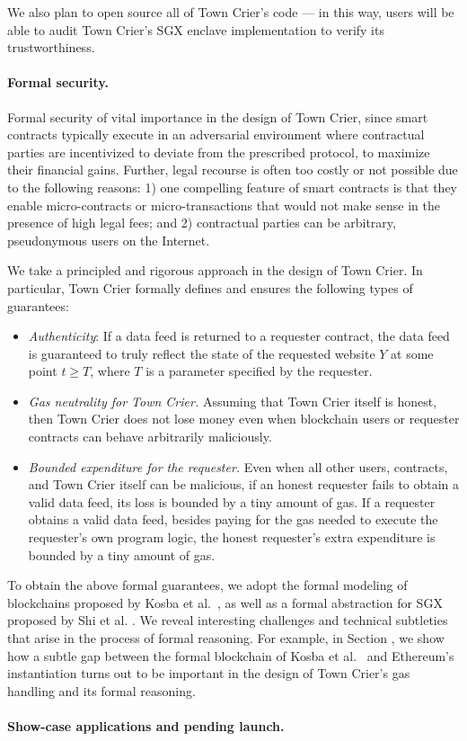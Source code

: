 We also plan to open source all of Town Crier's code --- in this way, 
users will be able to audit Town Crier's SGX enclave implementation
to verify its trustworthiness.


\paragraph{Formal security.}
Formal security of vital importance in the design of Town Crier, since
smart contracts  typically execute in an adversarial environment
where contractual parties are incentivized to 
deviate from the prescribed protocol, to maximize their financial gains.
Further, 
legal recourse is often too costly or 
not possible due to the following reasons:
1) one compelling feature of 
smart contracts is that they enable 
micro-contracts or micro-transactions that 
would not make sense in the presence of high legal fees;
and 2) contractual parties can be arbitrary, pseudonymous users on the Internet.

We take a principled and rigorous approach in the design of Town Crier. 
In particular, Town Crier formally defines and ensures  
the following types of guarantees:

\begin{itemize}[leftmargin=5mm]
\item
{\it Authenticity}: If a data feed is returned
to a requester contract, the data feed is guaranteed
to truly reflect the state of 
the requested website $Y$ 
at some point $t \geq T$, where $T$ is a parameter  specified 
by the requester.
\item
{\it Gas neutrality for Town Crier.} 
Assuming that Town Crier itself is honest, 
then Town Crier does not lose money   
even when blockchain users or requester contracts
can behave arbitrarily maliciously.
\item
{\it Bounded expenditure for the requester.} 
Even when all other users, contracts, and Town Crier itself 
can be malicious, 
if an honest requester  
fails to obtain a valid data feed, its loss is bounded by a tiny 
amount of gas.
If a requester obtains a valid data feed, besides paying for the gas
needed to execute the requester's own program logic, the honest requester's 
extra expenditure  
is bounded by a tiny amount of gas.
\end{itemize}

To obtain the above formal guarantees,
we adopt the formal modeling 
of blockchains proposed by Kosba et al.~\cite{hawk},
as well as a formal abstraction for SGX proposed by Shi et al. .
We reveal interesting challenges and technical subtleties
that arise in the process of formal reasoning.
For example, in Section , we show how 
a subtle gap between the formal blockchain
of Kosba et al.~\cite{hawk}
and Ethereum's instantiation  
turns out to be important in the design of Town Crier's
gas handling and its formal reasoning.  


\paragraph{Show-case applications and pending launch.}







